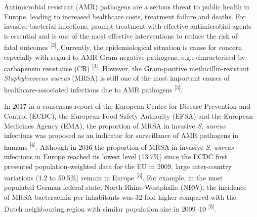 \documentclass[
]{book}
\begin{document}
Antimicrobial resistant (AMR) pathogens are a serious threat to public health in Europe, leading to increased healthcare costs, treatment failure and deaths. For invasive bacterial infections, prompt treatment with effective antimicrobial agents is essential and is one of the most effective interventions to reduce the risk of fatal outcomes \textsuperscript{{[}2{]}}. Currently, the epidemiological situation is cause for concern especially with regard to AMR Gram-negative pathogens, e.g., characterised by carbapenem resistance (CR) \textsuperscript{{[}3{]}}. However, the Gram-positive methicillin-resistant \emph{Staphylococcus aureus} (MRSA) is still one of the most important causes of healthcare-associated infections due to AMR pathogens \textsuperscript{{[}3{]}}.

In 2017 in a consensus report of the European Centre for Disease Prevention and Control (ECDC), the European Food Safety Authority (EFSA) and the European Medicines Agency (EMA), the proportion of MRSA in invasive \emph{S. aureus} infections was proposed as an indicator for surveillance of AMR pathogens in humans \textsuperscript{{[}4{]}}. Although in 2016 the proportion of MRSA in invasive \emph{S. aureus} infections in Europe reached its lowest level (13.7\%) since the ECDC first presented population-weighted data for the EU in 2009, large inter-country variations (1.2 to 50.5\%) remain in Europe \textsuperscript{{[}3{]}}. For example, in the most populated German federal state, North Rhine-Westphalia (NRW), the incidence of MRSA bacteraemia per inhabitants was 32-fold higher compared with the Dutch neighbouring region with similar population size in 2009--10 \textsuperscript{{[}5{]}}.
\end{document}
